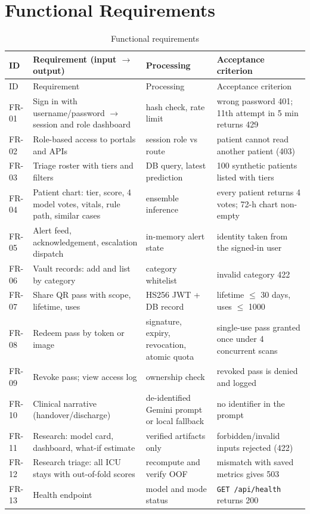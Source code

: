 \section{Functional Requirements}
\begin{small}
\begin{longtable}{@{}p{12mm}p{48mm}p{44mm}p{56mm}@{}}
\caption{Functional requirements}\label{tab:fr}\\
\toprule
ID & Requirement (input $\rightarrow$ output) & Processing & Acceptance criterion\\
\midrule
\endfirsthead
\toprule ID & Requirement & Processing & Acceptance criterion\\ \midrule
\endhead
FR-01 & Sign in with username/password $\rightarrow$ session and role dashboard & hash check, rate limit & wrong password 401; 11th attempt in 5 min returns 429\\
FR-02 & Role-based access to portals and APIs & session role vs route & patient cannot read another patient (403)\\
FR-03 & Triage roster with tiers and filters & DB query, latest prediction & 100 synthetic patients listed with tiers\\
FR-04 & Patient chart: tier, score, 4 model votes, vitals, rule path, similar cases & ensemble inference & every patient returns 4 votes; 72-h chart non-empty\\
FR-05 & Alert feed, acknowledgement, escalation dispatch & in-memory alert state & identity taken from the signed-in user\\
FR-06 & Vault records: add and list by category & category whitelist & invalid category 422\\
FR-07 & Share QR pass with scope, lifetime, uses & HS256 JWT + DB record & lifetime $\le$ 30 days, uses $\le$ 1000\\
FR-08 & Redeem pass by token or image & signature, expiry, revocation, atomic quota & single-use pass granted once under 4 concurrent scans\\
FR-09 & Revoke pass; view access log & ownership check & revoked pass is denied and logged\\
FR-10 & Clinical narrative (handover/discharge) & de-identified Gemini prompt or local fallback & no identifier in the prompt\\
FR-11 & Research: model card, dashboard, what-if estimate & verified artifacts only & forbidden/invalid inputs rejected (422)\\
FR-12 & Research triage: all ICU stays with out-of-fold scores & recompute and verify OOF & mismatch with saved metrics gives 503\\
FR-13 & Health endpoint & model and mode status & \texttt{GET /api/health} returns 200\\
\bottomrule
\end{longtable}
\end{small}

